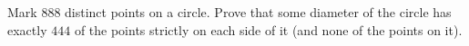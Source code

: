 Mark $888$ distinct points on a circle. Prove that some diameter of the circle has exactly $444$ of the points strictly on each side of it (and none of the points on it).
